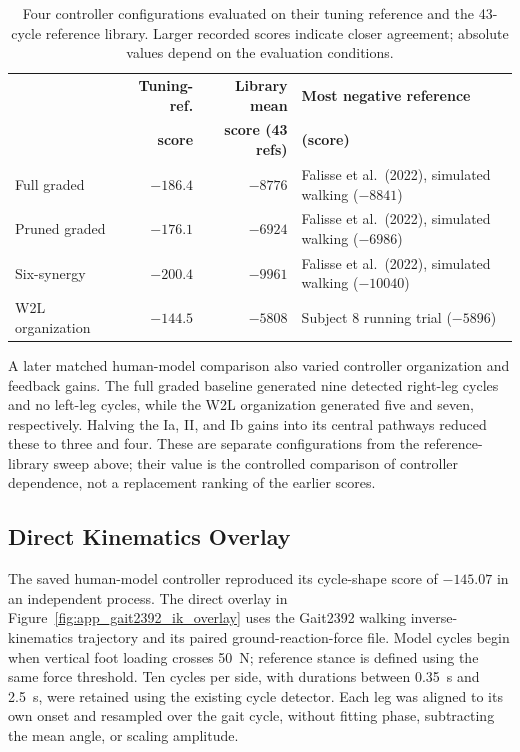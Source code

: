 \begin{table}[htbp]
\caption{Four controller configurations evaluated on their tuning reference and the 43-cycle reference library. Larger recorded scores indicate closer agreement; absolute values depend on the evaluation conditions.}
\label{tab:gait_sweep}
\begin{tabularx}{\textwidth}{@{}lrr>{\raggedright\arraybackslash}X@{}}
\toprule
 & \textbf{Tuning-ref.} & \textbf{Library mean} & \textbf{Most negative reference} \\
 & \textbf{score} & \textbf{score (43 refs)} & \textbf{(score)} \\
\midrule
Full graded        & $-186.4$ & $-8776$ & Falisse et al.\ (2022), simulated walking ($-8841$) \\
Pruned graded  & $-176.1$ & $-6924$ & Falisse et al.\ (2022), simulated walking ($-6986$) \\
Six-synergy       & $-200.4$ & $-9961$ & Falisse et al.\ (2022), simulated walking ($-10040$) \\
W2L organization     & $-144.5$ & $-5808$ & Subject 8 running trial ($-5896$) \\
\bottomrule
\end{tabularx}
\end{table}

A later matched human-model comparison also varied controller organization and feedback gains. The full graded baseline generated nine detected right-leg cycles and no left-leg cycles, while the W2L organization generated five and seven, respectively. Halving the Ia, II, and Ib gains into its central pathways reduced these to three and four. These are separate configurations from the reference-library sweep above; their value is the controlled comparison of controller dependence, not a replacement ranking of the earlier scores.

\subsection{Direct Kinematics Overlay}\label{sec:app_ik_overlay}

The saved human-model controller reproduced its cycle-shape score of $-145.07$ in an independent process. The direct overlay in Figure~\ref{fig:app_gait2392_ik_overlay} uses the Gait2392 walking inverse-kinematics trajectory and its paired ground-reaction-force file. Model cycles begin when vertical foot loading crosses \qty{50}{\newton}; reference stance is defined using the same force threshold. Ten cycles per side, with durations between \qty{0.35}{\second} and \qty{2.5}{\second}, were retained using the existing cycle detector. Each leg was aligned to its own onset and resampled over the gait cycle, without fitting phase, subtracting the mean angle, or scaling amplitude.

